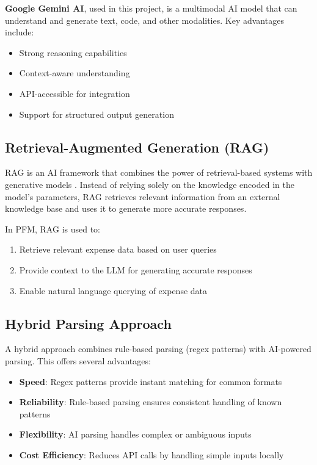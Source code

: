 \textbf{Google Gemini AI}, used in this project, is a multimodal AI model that can understand and generate text, code, and other modalities. Key advantages include:

\begin{itemize}
    \item Strong reasoning capabilities
    \item Context-aware understanding
    \item API-accessible for integration
    \item Support for structured output generation
\end{itemize}

\subsection{Retrieval-Augmented Generation (RAG)}

RAG is an AI framework that combines the power of retrieval-based systems with generative models \cite{lewis2020retrieval}. Instead of relying solely on the knowledge encoded in the model's parameters, RAG retrieves relevant information from an external knowledge base and uses it to generate more accurate responses.

In PFM, RAG is used to:
\begin{enumerate}
    \item Retrieve relevant expense data based on user queries
    \item Provide context to the LLM for generating accurate responses
    \item Enable natural language querying of expense data
\end{enumerate}

\subsection{Hybrid Parsing Approach}

A hybrid approach combines rule-based parsing (regex patterns) with AI-powered parsing. This offers several advantages:

\begin{itemize}
    \item \textbf{Speed}: Regex patterns provide instant matching for common formats
    \item \textbf{Reliability}: Rule-based parsing ensures consistent handling of known patterns
    \item \textbf{Flexibility}: AI parsing handles complex or ambiguous inputs
    \item \textbf{Cost Efficiency}: Reduces API calls by handling simple inputs locally
\end{itemize}

